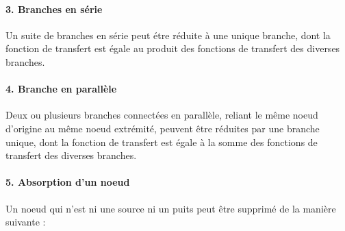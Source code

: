 \paragraph{3. Branches en série}
Un suite de branches en série peut étre réduite à une unique branche, dont la 
fonction de transfert est égale au produit des fonctions de transfert des 
diverses branches.
\begin{center}
    
\end{center}
\paragraph{4. Branche en parallèle}
Deux ou plusieurs branches connectées en parallèle, reliant le même noeud 
d'origine au même noeud extrémité, peuvent être réduites par une branche 
unique, dont la fonction de transfert est égale à la somme des fonctions de 
transfert des diverses branches. 
\begin{center}
    
\end{center}
\paragraph{5. Absorption d'un noeud}
Un noeud qui n'est ni une source ni un puits peut être supprimé de la
manière suivante :
\begin{center}
    
\end{center}

